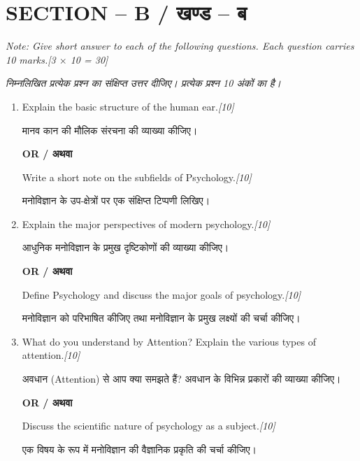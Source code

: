 \documentclass[11pt,a4paper]{article}
\newcommand{\pts}[1]{\hfill \textit{[#1]}}
\begin{document}
\bigskip

\section*{SECTION -- B / खण्ड -- ब}
\noindent \textit{Note: Give short answer to each of the following questions. Each question carries 10 marks.}\pts{3 $\times$ 10 = 30}

\noindent \textit{निम्नलिखित प्रत्येक प्रश्न का संक्षिप्त उत्तर दीजिए। प्रत्येक प्रश्न 10 अंकों का है।}

\begin{enumerate}[label=\textbf{\arabic*.},leftmargin=*,start=2,itemsep=12pt]

  \item Explain the basic structure of the human ear.\pts{10}
  
  मानव कान की मौलिक संरचना की व्याख्या कीजिए।

  \begin{center}\textbf{OR / अथवा}\end{center}

  Write a short note on the subfields of Psychology.\pts{10}
  
  मनोविज्ञान के उप-क्षेत्रों पर एक संक्षिप्त टिप्पणी लिखिए।

  \item Explain the major perspectives of modern psychology.\pts{10}
  
  आधुनिक मनोविज्ञान के प्रमुख दृष्टिकोणों की व्याख्या कीजिए।

  \begin{center}\textbf{OR / अथवा}\end{center}

  Define Psychology and discuss the major goals of psychology.\pts{10}
  
  मनोविज्ञान को परिभाषित कीजिए तथा मनोविज्ञान के प्रमुख लक्ष्यों की चर्चा कीजिए।

  \item What do you understand by Attention? Explain the various types of attention.\pts{10}
  
  अवधान (Attention) से आप क्या समझते हैं? अवधान के विभिन्न प्रकारों की व्याख्या कीजिए।

  \begin{center}\textbf{OR / अथवा}\end{center}

  Discuss the scientific nature of psychology as a subject.\pts{10}
  
  एक विषय के रूप में मनोविज्ञान की वैज्ञानिक प्रकृति की चर्चा कीजिए।

\end{enumerate}
\end{document}
